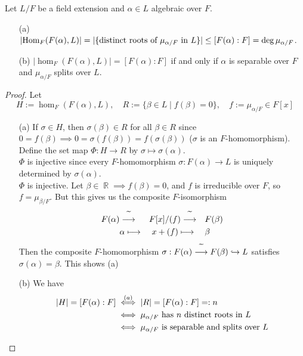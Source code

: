 \documentclass[11pt]{book}
\theoremstyle{definition}   \newtheorem{defn}[counter]{Definition} %
\DeclareMathOperator{\R}{\mathbb{R}}   \DeclareMathOperator{\N}{\mathbb{N}}   \DeclareMathOperator{\z}{\mathbb{Z}}   \DeclareMathOperator{\Q}{\mathbb{Q}}
\DeclareMathOperator{\ra}{\rightarrow}   \DeclareMathOperator{\Poly}{\mathbf{P}}   \DeclareMathOperator{\spn}{\textnormal{span}}   \DeclareMathOperator{\aut}{\textnormal{Aut}}
\numberwithin{counter}{chapter}
\begin{document}
\begin{lemma}
Let $L/F$ be a field extension and $\alpha \in L$ algebraic over $F$. 
\begin{enumerate}
\item[(a)] $|\textnormal{Hom}_F(F(\alpha),L)| = |\{\textnormal{distinct roots of } \mu_{\alpha/F} \textnormal{ in } L\}| \leq [F(\alpha) : F] = \deg \mu_{\alpha/F}$. 
\item[(b)] $|\hom_F(F(\alpha),L)| = [F(\alpha) : F]$ if and only if $\alpha$ is separable over $F$ and $\mu_{\alpha/F}$ splits over $L$. 
\end{enumerate}
\end{lemma}

\begin{proof}
Let
	\[H := \hom_F(F(\alpha),L), \quad R := \{\beta \in L \mid f(\beta) = 0\}, \quad f := \mu_{\alpha/F} \in F[x] \]
\begin{enumerate} 
\item[(a)] If $\sigma \in H$, then $\sigma(\beta) \in R$ for all $\beta \in R$ since $0 = f(\beta) \implies 0 = \sigma(f(\beta)) = f(\sigma(\beta))$ ($\sigma$ is an $F$-homomorphism). Define the set map $\Phi : H \ra R$ by $\sigma \mapsto \sigma(\alpha)$. \\

$\Phi$ is injective since every $F$-homomorphism $\sigma : F(\alpha) \ra L$ is uniquely determined by $\sigma(\alpha)$. \\

$\Phi$ is injective. Let $\beta \in \R \implies f(\beta) = 0$, and $f$ is irreducible over $F$, so $f = \mu_{\beta/F}$. But this gives us the composite $F$-isomorphism
\begin{alignat*}{3}
F(\alpha) & \overset{\widetilde{\quad}}{\longrightarrow} && F[x]/(f) \overset{\widetilde{\quad}}{\longrightarrow} && F(\beta) \\
& \alpha \longmapsto && \ x + (f) \longmapsto && \beta 
\end{alignat*}
Then the composite $F$-homomorphism $\sigma : F(\alpha) \overset{\widetilde{\quad}}{\longrightarrow} F(\beta) \hookrightarrow L$ satisfies $\sigma(\alpha) = \beta$. This shows (a) 

\item[(b)] We have
\begin{align*}
|H| = [F(\alpha) : F] & \overset{(a)}{\iff} |R| = [F(\alpha) : F] =: n \\
&\iff \mu_{\alpha/F} \textnormal{ has } n \textnormal{ distinct roots in } L \\
&\iff \mu_{\alpha/F} \textnormal{ is separable and splits over } L
\end{align*}
\end{enumerate} 
\end{proof}
\end{document}
